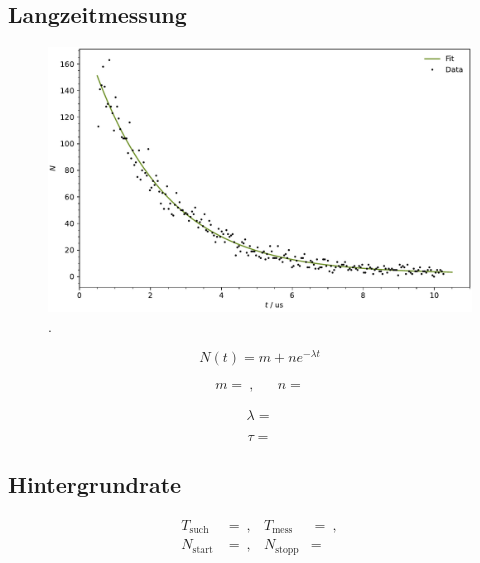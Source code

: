 \subsection{Langzeitmessung}

\begin{figure}[H]
	\centering
	\includegraphics[width=\textwidth]{build/lifetime.pdf}
	\caption{.}
	\label{fig:lifetime}
\end{figure}

\begin{equation*}
	N(t) = m + ne^{-\lambda t}
\end{equation*}

\begin{align*}
	m =  \: , && n = 
\end{align*}

\begin{equation*}
	\lambda = 
\end{equation*}

\begin{equation*}
	\tau = 
\end{equation*}



\subsection{Hintergrundrate}

\begin{align*}
	T_\text{such} &=  \: , & T_\text{mess} &=  \: , \\
	N_\text{start} &=  \: , & N_\text{stopp} &= 
\end{align*}

